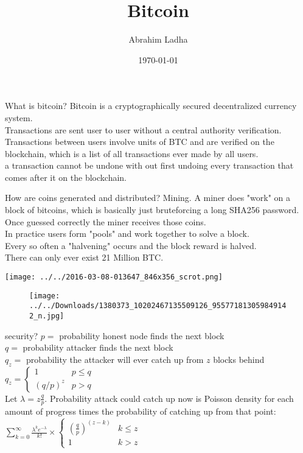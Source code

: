 \documentclass{beamer}
\title{Bitcoin}
\author{Abrahim Ladha}
\date{\today}
\begin{document}
\begin{frame}
\titlepage
\end{frame}

\begin{frame}
{\Huge What is bitcoin?}
Bitcoin is a cryptographically secured decentralized currency system.\\
Transactions are sent user to user without a central authority verification.
Transactions between users involve units of BTC and are verified on the blockchain, which is a list of all transactions ever made by all users. \\
a transaction cannot be undone with out first undoing every transaction that comes after it on the blockchain.

\end{frame}

\begin{frame}
{\Huge How are coins generated and distributed?}
Mining.
A miner does "work" on a block of bitcoins, which is basically just bruteforcing a long SHA256 password.\\
Once guessed correctly the miner receives those coins. \\
In practice users form "pools" and work together to solve a block.\\
Every so often a "halvening" occurs and the block reward is halved.\\
There can only ever exist 21 Million BTC.

\end{frame}

\begin{frame}

\texttt{[image: ../../2016-03-08-013647\_846x356\_scrot.png]}
\begin{figure}[ht!]
\texttt{[image: ../../Downloads/1380373\_10202467135509126\_955771813059849142\_n.jpg]} 
\end{figure}
\end{frame}

\begin{frame}
{\Huge security?}
$p = $ probability honest node finds the next block\\
$q = $ probability attacker finds the next block\\
$q_z = $ probability the attacker will ever catch up from $z$ blocks behind \\
$
q_z =
\begin{cases}
1 & p \leq q \\
(q/p)^z &  p > q
\end{cases}
$\\
Let $\lambda = z\frac{q}{p}$.
Probability attack could catch up now is Poisson density for each amount of progress times the probability of catching up from that point:
$\sum_{k = 0}^{\infty} \frac{\lambda^k e^{-\lambda}}{k!} \times 
\begin{cases}
(\frac{q}{p})^{(z-k)} & k \leq z \\
1 &  k > z
\end{cases}$
\end{frame}
\end{document}
